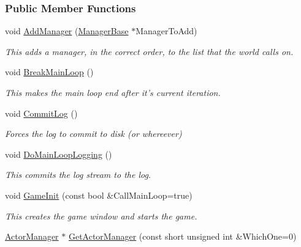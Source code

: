 \subsubsection*{Public Member Functions}
\begin{DoxyCompactItemize}
\item 
void \hyperlink{classMezzanine_1_1World_a783c33688669c84f4c697465b75e10b6}{AddManager} (\hyperlink{classMezzanine_1_1ManagerBase}{ManagerBase} $\ast$ManagerToAdd)
\begin{DoxyCompactList}\small\item\em This adds a manager, in the correct order, to the list that the world calls on. \item\end{DoxyCompactList}\item 
void \hyperlink{classMezzanine_1_1World_a62999cde70050a850fd8191bde7440e3}{BreakMainLoop} ()
\begin{DoxyCompactList}\small\item\em This makes the main loop end after it's current iteration. \item\end{DoxyCompactList}\item 
void \hyperlink{classMezzanine_1_1World_a1cd71f4206c4b22cd887222511188a55}{CommitLog} ()
\begin{DoxyCompactList}\small\item\em Forces the log to commit to disk (or whereever) \item\end{DoxyCompactList}\item 
void \hyperlink{classMezzanine_1_1World_a3e3b7f68987ee841862835cec9c6f118}{DoMainLoopLogging} ()
\begin{DoxyCompactList}\small\item\em This commits the log stream to the log. \item\end{DoxyCompactList}\item 
void \hyperlink{classMezzanine_1_1World_a72d6d82926bfbfca96c246f109f0fc58}{GameInit} (const bool \&CallMainLoop=true)
\begin{DoxyCompactList}\small\item\em This creates the game window and starts the game. \item\end{DoxyCompactList}\item 
\hyperlink{classMezzanine_1_1ActorManager}{ActorManager} $\ast$ \hyperlink{classMezzanine_1_1World_abeee5435e00825ea4e776f508794c978}{GetActorManager} (const short unsigned int \&WhichOne=0)

\end{DoxyCompactItemize}
